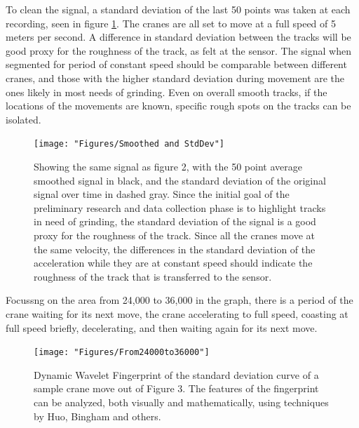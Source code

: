 \documentclass[journal=jacsat,manuscript=article]{achemso}
\begin{document}
To clean the signal, a standard deviation of the last 50 points was taken at each recording, seen in figure \ref{fig:Smoothed_StdDev}.  The cranes are all set to move at a full speed of 5 meters per second.  A difference in standard deviation between the tracks will be good proxy for the roughness of the track, as felt at the sensor.  The signal when segmented for period of constant speed should be comparable between different cranes, and those with the higher standard deviation during movement are the ones likely in most needs of grinding.  Even on overall smooth tracks, if the locations of the movements are known, specific rough spots on the tracks can be isolated.

\begin{figure}
	\centering
	\texttt{[image: "Figures/Smoothed and StdDev"]}
	\caption[Smoothed and StdDev]{Showing the same signal as figure 2, with the 50 point average smoothed signal in black, and the standard deviation of the original signal over time in dashed gray.  Since the initial goal of the preliminary research and data collection phase is to highlight tracks in need of grinding, the standard deviation of the signal is a good proxy for the roughness of the track.  Since all the cranes move at the same velocity, the differences in the standard deviation of the acceleration while they are at constant speed should indicate the roughness of the track that is transferred to the sensor.}
	\label{fig:Smoothed_StdDev}
\end{figure}

Focussng on the area from 24,000 to 36,000 in the graph, there is a period of the crane waiting for its next move, the crane accelerating to full speed, coasting at full speed briefly, decelerating, and then waiting again for its next move.  

\begin{figure}
	\centering
	\texttt{[image: "Figures/From24000to36000"]}
	\caption[Smoothed and StdDev]{Dynamic Wavelet Fingerprint of the standard deviation curve of a sample crane move out of Figure 3.  The features of the fingerprint can be analyzed, both visually and mathematically, using techniques by Huo, Bingham and others.}
	\label{fig:StdDevFingerprint}
\end{figure}
\end{document}

